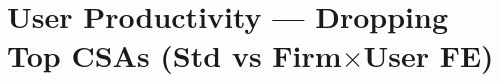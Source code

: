 \documentclass[11pt]{article}
\begin{document}
\section*{User Productivity — Dropping Top CSAs (Std vs Firm$\times$User FE)}

\end{document}
